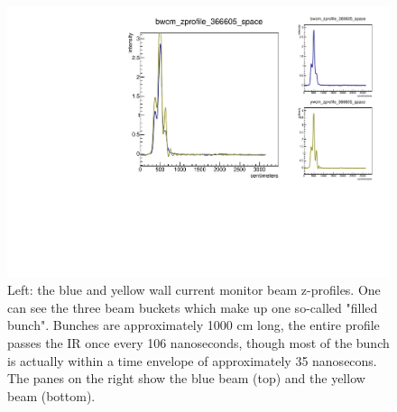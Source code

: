 \begin{figure}
\begin{center}
\includegraphics[width=\linewidth,height=\textheight,keepaspectratio]{./figures/366605_wcm_zprofile}
\caption{ 
Left: the blue and yellow wall current monitor beam z-profiles. One can see the
three beam buckets which make up one so-called "filled bunch". Bunches are
approximately 1000 cm long, the entire profile passes the IR once every 106
nanoseconds, though most of the bunch is actually within a time envelope of
approximately 35 nanosecons. The panes on the right show the blue beam (top)
and the yellow beam (bottom).
}
\label{fig:366605_wcm_zprofile}
\end{center}
\end{figure}
